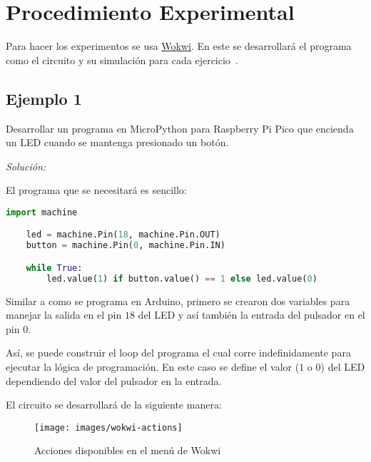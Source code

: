 \documentclass{article}
\begin{document}
    \section{Procedimiento Experimental}\label{sec:procedimiento-experimental}

    Para hacer los experimentos se usa \href{https://wokwi.com}{Wokwi}. En
    este se desarrollará el programa como el circuito y su simulación para
    cada ejercicio~\cite{ricardo-adonis-caraccioli-abrego-2022}.

    \subsection{Ejemplo 1}

    Desarrollar un programa en MicroPython para Raspberry Pi Pico que
    encienda un LED cuando se mantenga presionado un botón.

    \bigbreak

    \textit{Solución:}

    \bigbreak

    El programa que se necesitará es sencillo:

    \begin{lstlisting}[language=Python, caption={Programa para el ejemplo 1}]
    import machine

    led = machine.Pin(18, machine.Pin.OUT)
    button = machine.Pin(0, machine.Pin.IN)

    while True:
        led.value(1) if button.value() == 1 else led.value(0)
    \end{lstlisting}

    Similar a como se programa en Arduino, primero se crearon dos variables
    para manejar la salida en el pin $18$ del LED y así también la entrada
    del pulsador en el pin $0$.

    \bigbreak

    Así, se puede construir el loop del programa el cual corre
    indefinidamente para ejecutar la lógica de programación. En este caso se
    define el valor ($1$ o $0$) del LED dependiendo del valor del pulsador en
    la entrada.

    \bigbreak

    El circuito se desarrollará de la siguiente manera:

    \begin{figure}[H]
        \centering
        \texttt{[image: images/wokwi-actions]}
        \caption{Acciones disponibles en el menú de Wokwi}
    \end{figure}
\end{document}
